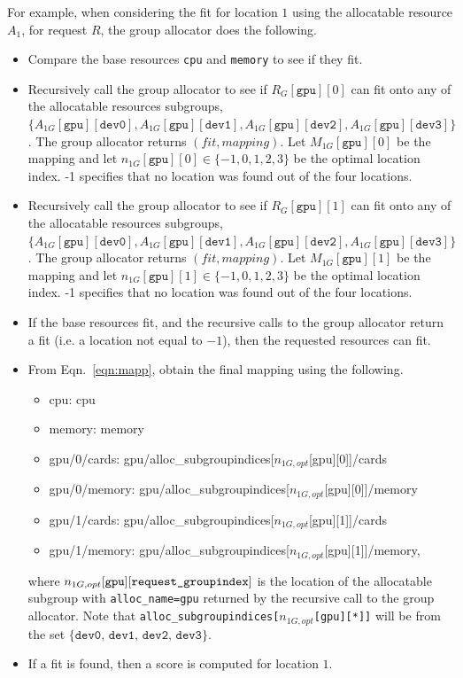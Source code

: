 \documentclass[12pt,onecolumn]{IEEEtran}
\newcommand{\bus}{\_\allowbreak}
\begin{document}
For example, when considering the fit for location $1$ using the 
allocatable resource $A_1$, for request $R$,
the group allocator does the following.
\begin{itemize}
\item
Compare the base resources \texttt{cpu} and \texttt{memory} to see if they
fit.
\item
Recursively call the group allocator to see if
$R_G[\texttt{gpu}][0]$ can fit onto any of the allocatable resources
subgroups,
$\{A_{1G}[\texttt{gpu}][\texttt{dev0}], A_{1G}[\texttt{gpu}][\texttt{dev1}],
A_{1G}[\texttt{gpu}][\texttt{dev2}], A_{1G}[\texttt{gpu}][\texttt{dev3}]\}$.
The group allocator returns $(fit, mapping)$.
Let $M_{1G}[\texttt{gpu}][0]$ be the mapping and
let $n_{1G}[\texttt{gpu}][0] \in \{-1, 0,1,2,3\}$ be the optimal location index.
-1 specifies that no location was found out of the four locations.
\item
Recursively call the group allocator to see if
$R_G[\texttt{gpu}][1]$ can fit onto any of the allocatable resources
subgroups,
$\{A_{1G}[\texttt{gpu}][\texttt{dev0}], A_{1G}[\texttt{gpu}][\texttt{dev1}],
A_{1G}[\texttt{gpu}][\texttt{dev2}], A_{1G}[\texttt{gpu}][\texttt{dev3}]\}$.
The group allocator returns $(fit, mapping)$.
Let $M_{1G}[\texttt{gpu}][1]$ be the mapping and
let $n_{1G}[\texttt{gpu}][1] \in \{-1, 0,1,2,3\}$ be the optimal location index.
-1 specifies that no location was found out of the four locations.
\item
If the base resources fit, and the recursive calls to the group
allocator return a fit (i.e. a location not equal to $-1$),
then the requested resources can fit.
\item
From Eqn.~\ref{eqn:mapp}, obtain the final mapping using the following.
\ttfamily
\begin{itemize}
\item[] cpu: cpu
\item[] memory: memory
\item[] gpu/0/cards: gpu/alloc{\bus}subgroupindices[$n_{1G,opt}$[gpu][0]]/cards
\item[] gpu/0/memory: gpu/alloc{\bus}subgroupindices[$n_{1G,opt}$[gpu][0]]/memory
\item[] gpu/1/cards: gpu/alloc{\bus}subgroupindices[$n_{1G,opt}$[gpu][1]]/cards
\item[] gpu/1/memory: gpu/alloc{\bus}subgroupindices[$n_{1G,opt}$[gpu][1]]/memory,
\end{itemize}
\normalfont
where $n_{1G,opt}[\texttt{gpu}][\texttt{request{\bus}groupindex}]$ 
is the location of the allocatable
subgroup with \texttt{alloc{\bus}name=gpu} returned
by the recursive call to the group allocator.
Note that 
\texttt{alloc{\bus}sub\-group\-indices[$n_{1G,opt}$[gpu][*]]} will be from
the set $\{\texttt{dev0, dev1, dev2, dev3}\}$.
\item
If a fit is found, then a score is computed for location $1$.
\end{itemize}
\end{document}
